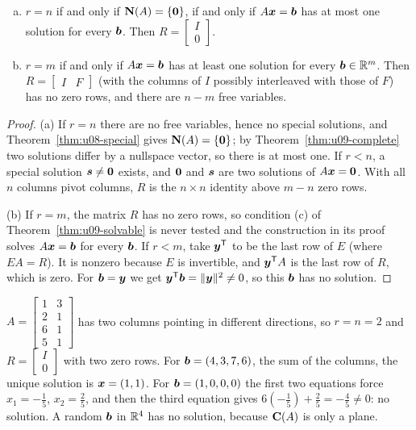 \begin{theorem}\label{thm:u09-fullrank}
\begin{enumerate}[(a)]
\item $r=n$ if and only if $\mathbf{N}(A)=\{\boldsymbol{0}\}$, if and only if $A\boldsymbol{x}=\boldsymbol{b}$ has at most one
solution for every $\boldsymbol{b}$. Then $R=\begin{bmatrix}I\\0\end{bmatrix}$.
\item $r=m$ if and only if $A\boldsymbol{x}=\boldsymbol{b}$ has at least one solution for every $\boldsymbol{b}\in\mathbb{R}^m$.
Then $R=\begin{bmatrix}I&F\end{bmatrix}$ (with the columns of $I$ possibly interleaved with those of
$F$) has no zero rows, and there are $n-m$ free variables.
\end{enumerate}
\end{theorem}
\begin{proof}
(a) If $r=n$ there are no free variables, hence no special solutions, and
Theorem~\ref{thm:u08-special} gives $\mathbf{N}(A)=\{\boldsymbol{0}\}$; by Theorem~\ref{thm:u09-complete}
two solutions differ by a nullspace vector, so there is at most one. If $r<n$, a special solution
$\boldsymbol{s}\ne\boldsymbol{0}$ exists, and $\boldsymbol{0}$ and $\boldsymbol{s}$ are two solutions of $A\boldsymbol{x}=\boldsymbol{0}$.
With all $n$ columns pivot columns, $R$ is the $n\times n$ identity above $m-n$ zero rows.

(b) If $r=m$, the matrix $R$ has no zero rows, so condition (c) of Theorem~\ref{thm:u09-solvable}
is never tested and the construction in its proof solves $A\boldsymbol{x}=\boldsymbol{b}$ for every $\boldsymbol{b}$. If
$r<m$, take $\boldsymbol{y}^{\mathsf{T}}$ to be the last row of $E$ (where $EA=R$). It is nonzero because $E$ is
invertible, and $\boldsymbol{y}^{\mathsf{T}} A$ is the last row of $R$, which is zero. For $\boldsymbol{b}=\boldsymbol{y}$ we get
$\boldsymbol{y}^{\mathsf{T}}\boldsymbol{b}=\|\boldsymbol{y}\|^2\ne0$, so this $\boldsymbol{b}$ has no solution.
\end{proof}

\begin{example}\label{ex:u09-tall}
$A=\begin{bmatrix}1&3\\2&1\\6&1\\5&1\end{bmatrix}$ has two columns pointing in different
directions, so $r=n=2$ and $R=\begin{bmatrix}I\\0\end{bmatrix}$ with two zero rows. For
$\boldsymbol{b}=(4,3,7,6)$, the sum of the columns, the unique solution is $\boldsymbol{x}=(1,1)$. For
$\boldsymbol{b}=(1,0,0,0)$ the first two equations force $x_1=-\tfrac15$, $x_2=\tfrac25$, and then the
third equation gives $6(-\tfrac15)+\tfrac25=-\tfrac45\ne0$: no solution. A random $\boldsymbol{b}$ in
$\mathbb{R}^4$ has no solution, because $\mathbf{C}(A)$ is only a plane.
\end{example}

